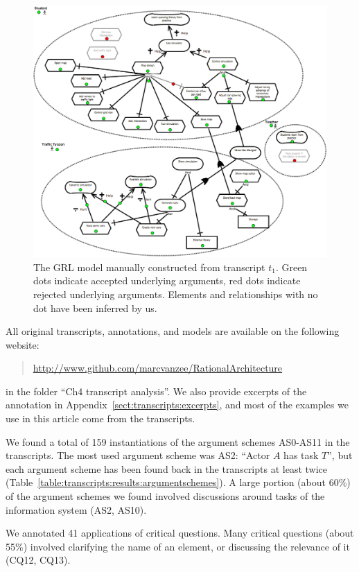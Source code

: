 \begin{figure}[h]
\includegraphics[width=\textwidth]{img/transcript_grl}
\caption{The GRL model manually constructed from transcript $t_1$. Green dots indicate accepted underlying arguments, red dots indicate rejected underlying arguments. Elements and relationships with no dot have been inferred by us.}
\label{fig:transcripts:grl}
\end{figure}

All original transcripts, annotations, and models are available on the following website:
\begin{quote} \url{http://www.github.com/marcvanzee/RationalArchitecture}
\end{quote}
in the folder ``Ch4 transcript analysis''. We also provide excerpts of the annotation in Appendix~\ref{sect:transcripts:excerpts}, and most of the examples we use in this article come from the transcripts.

We found a total of 159 instantiations of the argument schemes AS0-AS11 in the transcripts. The most used argument scheme was AS2: ``Actor $A$ has task $T$'', but each argument scheme has been found back in the transcripts at least twice (Table~\ref{table:transcripts:results:argumentschemes}). A large portion (about 60\%) of the argument schemes we found involved discussions around tasks of the information system (AS2, AS10).

We annotated 41 applications of critical questions. Many critical questions (about 55\%) involved clarifying the name of an element, or discussing the relevance of it (CQ12, CQ13).

